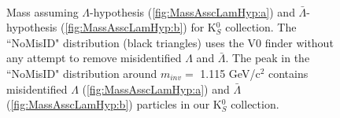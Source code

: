 \documentclass[../AnalysisNoteJBuxton.tex]{subfiles}
\begin{document}
\begin{figure}[h!]
  \centering
  \\
  \caption[$\Lambda$($\bar{\Lambda}$) contamination in K$^{0}_{S}$ collection]{Mass assuming $\Lambda$-hypothesis (\ref{fig:MassAsscLamHyp:a}) and $\bar{\Lambda}$-hypothesis (\ref{fig:MassAsscLamHyp:b}) for K$^{0}_{S}$ collection.
  The ``NoMisID" distribution (black triangles) uses the V0 finder without any attempt to remove misidentified $\Lambda$ and $\bar{\Lambda}$.
  The peak in the ``NoMisID" distribution around $m_{inv} = $ 1.115 GeV/c$^{2}$ contains misidentified $\Lambda$ (\ref{fig:MassAsscLamHyp:a}) and $\bar{\Lambda}$ (\ref{fig:MassAsscLamHyp:b}) particles in our K$^{0}_{S}$ collection.  
}
\end{figure}
\end{document}
